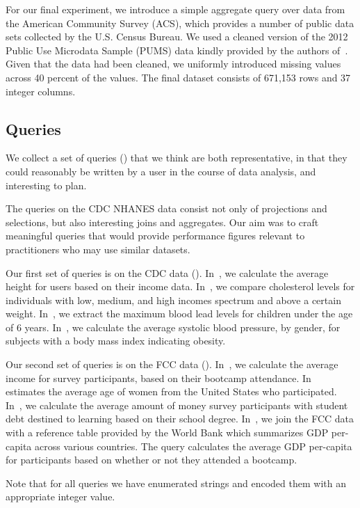 For our final experiment, we introduce a simple aggregate query over data from the American Community Survey (ACS), which
provides a number of public data sets collected by the U.S. Census Bureau.
We used a cleaned version of the 2012 Public Use Microdata Sample (PUMS) data kindly provided by the authors of~\cite{akande2015empirical}.
Given that the data had been cleaned, we uniformly introduced missing values across 40 percent of the values. The final dataset consists
of 671,153 rows and 37 integer columns.

\subsection{Queries}
We collect a set of queries () that we think are both representative,
in that they could reasonably be written by a user in the course of data analysis, and
interesting to plan.

The queries on the CDC NHANES data consist not only of projections and selections,
but also interesting joins and aggregates. Our aim was to craft meaningful queries
that would provide performance figures relevant to practitioners who may use
similar datasets.

Our first set of queries is on the CDC data (). In~, we calculate the average height for
users based on their income data. In~, we compare cholesterol levels for
individuals with low, medium, and high incomes spectrum and above a certain weight. In~, 
we extract the maximum blood lead levels for children under the age of 6
years. In~, we calculate the average systolic blood pressure, by gender, for
subjects with a body mass index indicating obesity. 

Our second set of queries is on the FCC data (). In~, we calculate the average income for
survey participants, based on their bootcamp attendance. In~ estimates the
average age of women from the United States who participated. In~, we
calculate the average amount of money survey participants with student debt destined to
learning based on their school degree. In~, we join the FCC data with a
reference table provided by the World Bank which summarizes GDP per-capita across various
countries\cite{worldbank-data}. The query calculates the average GDP per-capita for
participants based on whether or not they attended a bootcamp. 

Note that for all queries we have enumerated strings and encoded them with
an appropriate integer value.

